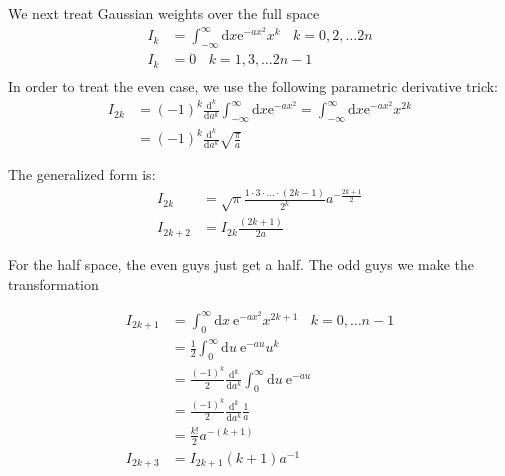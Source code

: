 \documentclass[paper=a4, fontsize=11pt]{article} %
\numberwithin{equation}{section} %
\numberwithin{figure}{section} %
\numberwithin{table}{section} %
\newcommand{\re}{{\mathrm{e}}}
\newcommand{\rd}{{\mathrm{d}}}
\begin{document}
We next treat Gaussian weights over the full space
\begin{equation}
\begin{split}
I_k &= \int_{-\infty}^{\infty} \rd x \re^{-ax^2} x^k\ \ \ \ k = 0,2,\ldots 2n \\
I_k &= 0\ \ \ \ k = 1,3,\ldots 2n-1 \\
\end{split}
\end{equation}
In order to treat the even case, we use the following parametric derivative trick:
\begin{equation}
\begin{split}
I_{2k} &= (-1)^k \frac{\rd ^{k}}{\rd a^k} \int_{-\infty}^{\infty} \rd x \re^{-a x^2}= \int_{-\infty}^{\infty} \rd x \re^{-ax^2} x^{2k}\\
&= (-1)^k \frac{\rd ^{k}}{\rd a^k} \sqrt{\frac{\pi}{a}}
\end{split}
\end{equation}

The generalized form is:
\begin{equation}
\begin{split}
I_{2k} &= \sqrt{\pi} \frac{1\cdot 3 \cdot \ldots \cdot (2k-1)}{2^k}a^{-\frac{2k+1}{2}}\\
I_{2k+2} &= I_{2k}\frac{(2k+1)}{2a}
\end{split}
\end{equation}

For the half space, the even guys just get a half. The odd guys we make the transformation

\begin{equation}
\begin{split}
I_{2k+1} &= \int_{0}^{\infty} \rd x\ \re^{-ax^2} x^{2k+1}\ \ \ \ k = 0,\ldots n-1 \\
&= \frac{1}{2}\int_{0}^{\infty} \rd u\ \re^{-au} u^k \\
&= \frac{(-1)^k }{2} \frac{\rd ^{k}}{\rd a^k}\int_{0}^{\infty} \rd u\ \re^{-au} \\
&= \frac{(-1)^k }{2} \frac{\rd ^{k}}{\rd a^k} \frac{1}{a}\\
&= \frac{k!}{2} a^{-(k+1)}\\
I_{2k+3} &= I_{2k+1} (k+1)a^{-1}
\end{split}
\end{equation}
\end{document}
